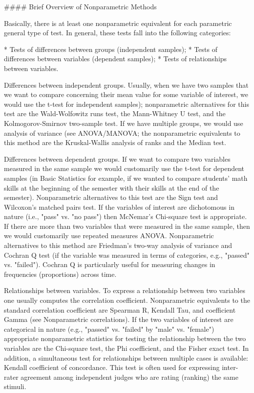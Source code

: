 #### {Brief Overview of Nonparametric Methods}

Basically, there is at least one nonparametric equivalent for each parametric general type of test. In general, these tests fall into the following categories:

\begin{itemize}
* Tests of differences between groups (independent samples);
* Tests of differences between variables (dependent samples);
* Tests of relationships between variables.
\end{itemize}

Differences between independent groups. Usually, when we have two samples that we want to compare concerning their mean value for some variable of interest, we would use the t-test for independent samples); nonparametric alternatives for this test are the Wald-Wolfowitz runs test, the Mann-Whitney U test, and the Kolmogorov-Smirnov two-sample test. If we have multiple groups, we would use analysis of variance (see ANOVA/MANOVA; the nonparametric equivalents to this method are the Kruskal-Wallis analysis of ranks and the Median test.

Differences between dependent groups. If we want to compare two variables measured in the same sample we would customarily use the t-test for dependent samples (in Basic Statistics for example, if we wanted to compare students' math skills at the beginning of the semester with their skills at the end of the semester). Nonparametric alternatives to this test are the Sign test and Wilcoxon's matched pairs test. If the variables of interest are dichotomous in nature (i.e., "pass" vs. "no pass") then McNemar's Chi-square test is appropriate. If there are more than two variables that were measured in the same sample, then we would customarily use repeated measures ANOVA. Nonparametric alternatives to this method are Friedman's two-way analysis of variance and Cochran Q test (if the variable was measured in terms of categories, e.g., "passed" vs. "failed"). Cochran Q is particularly useful for measuring changes in frequencies (proportions) across time.

Relationships between variables. To express a relationship between two variables one usually computes the correlation coefficient. Nonparametric equivalents to the standard correlation coefficient are Spearman R, Kendall Tau, and coefficient Gamma (see Nonparametric correlations). If the two variables of interest are categorical in nature (e.g., "passed" vs. "failed" by "male" vs. "female") appropriate nonparametric statistics for testing the relationship between the two variables are the Chi-square test, the Phi coefficient, and the Fisher exact test. In addition, a simultaneous test for relationships between multiple cases is available: Kendall coefficient of concordance. This test is often used for expressing inter-rater agreement among independent judges who are rating (ranking) the same stimuli.


